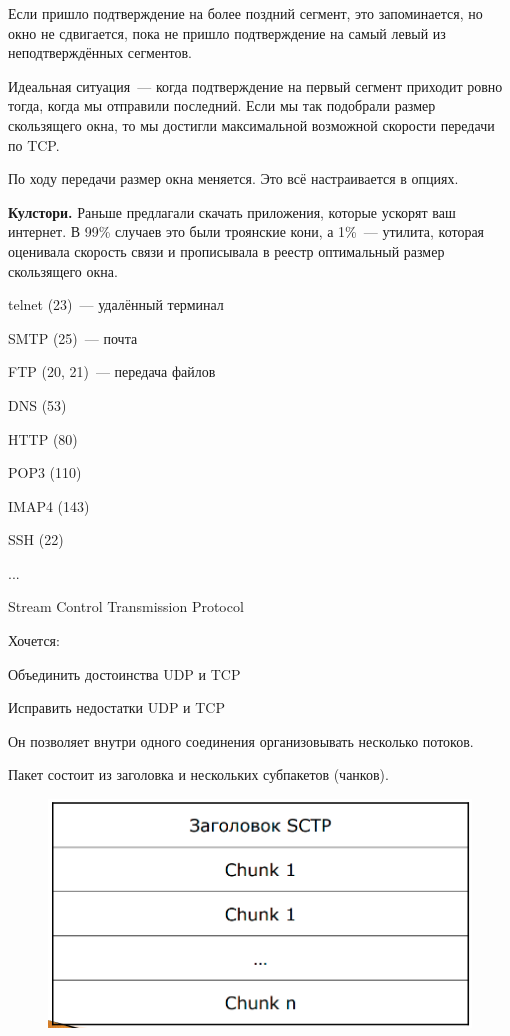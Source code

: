 Если пришло подтверждение на более поздний сегмент, это запоминается, но окно не сдвигается, пока не пришло подтверждение на самый левый из неподтверждённых сегментов.

Идеальная ситуация~--- когда подтверждение на первый сегмент приходит ровно тогда, когда мы отправили последний. Если мы так подобрали размер скользящего окна, то мы достигли максимальной возможной скорости передачи по TCP.

По ходу передачи размер окна меняется. Это всё настраивается в опциях.

{\bf Кулстори.} Раньше предлагали скачать приложения, которые ускорят ваш интернет. В 99\% случаев это были троянские кони, а 1\%~--- утилита, которая оценивала скорость связи и прописывала в реестр оптимальный размер скользящего окна.


\begin{MyItemize}
    \item telnet (23)~--- удалённый терминал
    \item SMTP (25)~--- почта
    \item FTP (20, 21)~--- передача файлов
    \item DNS (53)
    \item HTTP (80)
    \item POP3 (110)
    \item IMAP4 (143)
    \item SSH (22)
    \item ...
\end{MyItemize}


Stream Control Transmission Protocol

Хочется:
\begin{MyItemize}
    \item Объединить достоинства UDP и TCP
    \item Исправить недостатки UDP и TCP
\end{MyItemize}

Он позволяет внутри одного соединения организовывать несколько потоков.

Пакет состоит из заголовка и нескольких субпакетов (чанков).

\begin{figure}[H]
  \centering
  \includegraphics[width=15cm]{images/03/07}
\end{figure}

